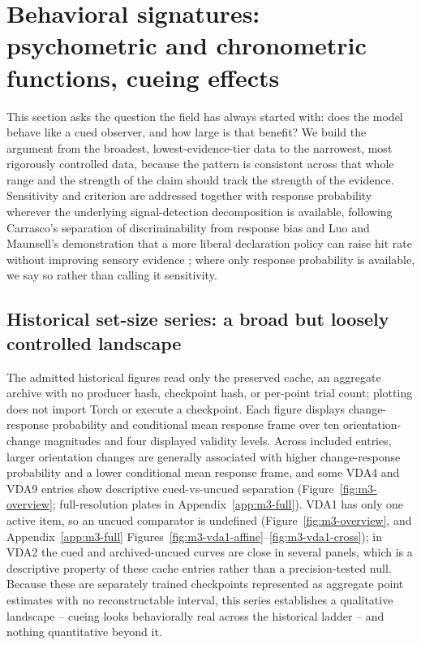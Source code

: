 \documentclass[11pt,a4paper]{article}
\begin{document}
\section{Behavioral signatures: psychometric and chronometric functions, cueing effects}\label{sec:behavior}
This section asks the question the field has always started with: does the model behave like a cued observer, and how large is that benefit? We build the argument from the broadest, lowest-evidence-tier data to the narrowest, most rigorously controlled data, because the pattern is consistent across that whole range and the strength of the claim should track the strength of the evidence. Sensitivity and criterion are addressed together with response probability wherever the underlying signal-detection decomposition is available, following Carrasco's separation of discriminability from response bias and Luo and Maunsell's demonstration that a more liberal declaration policy can raise hit rate without improving sensory evidence \citep{carrasco2011,luo2018}; where only response probability is available, we say so rather than calling it sensitivity.

\subsection{Historical set-size series: a broad but loosely controlled landscape}\label{sec:historical-behavior}
The admitted historical figures read only the preserved  cache, an aggregate archive with no producer hash, checkpoint hash, or per-point trial count; plotting does not import Torch or execute a checkpoint. Each figure displays change-response probability and conditional mean response frame over ten orientation-change magnitudes and four displayed validity levels. Across included entries, larger orientation changes are generally associated with higher change-response probability and a lower conditional mean response frame, and some VDA4 and VDA9 entries show descriptive cued-vs-uncued separation (Figure~\ref{fig:m3-overview}; full-resolution plates in Appendix~\ref{app:m3-full}). VDA1 has only one active item, so an uncued comparator is undefined (Figure~\ref{fig:m3-overview}, and Appendix~\ref{app:m3-full} Figures~\ref{fig:m3-vda1-affine}--\ref{fig:m3-vda1-cross}); in VDA2 the cued and archived-uncued curves are close in several panels, which is a descriptive property of these cache entries rather than a precision-tested null. Because these are separately trained checkpoints represented as aggregate point estimates with no reconstructable interval, this series establishes a qualitative landscape -- cueing looks behaviorally real across the historical ladder -- and nothing quantitative beyond it.
\end{document}
